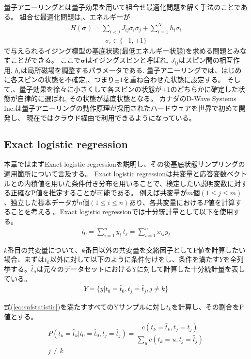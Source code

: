 \documentclass[9pt, twocolumn]{jarticle}
\begin{document}
	量子アニーリングとは量子効果を用いて組合せ最適化問題を解く手法のことである。
	組合せ最適化問題は,、エネルギーが
	\begin{eqnarray}
		H(\bm{\sigma}) = \sum_{i<j}J_{ij}\sigma_i \sigma_j + \sum_{i=1}^{N}h_i\sigma_i
	\end{eqnarray}
	\begin{eqnarray}
		\sigma_i \in\{-1,+1\}\nonumber
	\end{eqnarray}
	で与えられるイジング模型の基底状態(最低エネルギー状態)を求める問題とみなすことができる。
	ここで$\bm{\sigma}$はイジングスピンと呼ばれ, $J_{ij}$はスピン間の相互作用, $h_i$は局所磁場を調整するパラメータである.
	量子アニーリングでは、はじめに各スピンの状態を不確定,、つまり$\pm1$を重ね合わせた状態に設定する。
	そして,、量子効果を徐々に小さくして各スピンの状態が$\pm1$のどちらかに確定した状態が自律的に選ばれ, その状態が基底状態となる。
	カナダのD-Wave Systems Inc.は量子アニーリングの動作原理が採用されたハードウェアを世界で初めて開発し、
	現在ではクラウド経由で利用できるようになっている\cite{dwave}。
	
	\subsection{Exact logistic regression}
	本章ではまずExact logistic regressionを説明し、その後基底状態サンプリングの適用箇所について言及する。
	Exact logistic regressionは共変量と応答変数ベクトルとの内積値を用いた条件付き分布を用いることで、検定したい説明変数に対する正確なP値を推定することが可能である\cite{cox70}。
	例えば共変量が$m$個$( 1\leq  j \leq m )$、独立した標本データが$n$個$( 1\leq  i \leq n )$あり、各共変量における$Ρ$値を計算することを考える.。Exact logistic regressionでは十分統計量として以下を使用する。
	\begin{eqnarray}
		t_0=\sum_{i=1}^n y_i\:
		t_j=\sum_{i=1}^n x_{ij}y_i
	\end{eqnarray}

	$k$番目の共変量について、$k$番目以外の共変量を交絡因子としてΡ値を計算したい場合、まずは$t_k$以外に対して以下のように条件付けをし、条件を満たす$Y$を全列挙する。$\hat{t}_n$は元々のデータセットにおけるYに対して計算した十分統計量を表している。
	\begin{eqnarray}
		Y = \{y|t_0=\hat{t}_0, t_j=\hat{t}_j, {j} \neq{k}\}
		\label{eq:sufstatistic}
	\end{eqnarray}

	式(\ref{eq:sufstatistic})を満たすすべてのYサンプルに対し$t_k$を計算し、その割合をΡ値とする。
	\begin{eqnarray}
		P(t_k=\hat{t}_k | t_0=\hat{t}_0,t_j=\hat{t}_j) = \dfrac{c( t_k=\hat{t}_k, t_j=\hat{t}_j)}{\sum_{u} c( t_k=u, t_j=\hat{t}_j)}\\
		j \neq k \nonumber
	\end{eqnarray}
	
\end{document}
